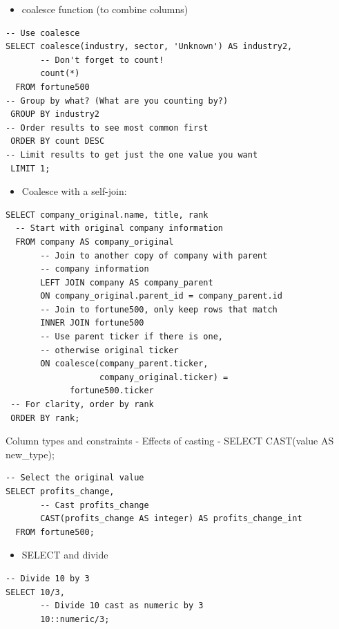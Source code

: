 \documentclass[]{book}
\providecommand{\tightlist}{%
  \setlength{\itemsep}{0pt}\setlength{\parskip}{0pt}}
\begin{document}
\begin{itemize}
\tightlist
\item
  coalesce function (to combine columns)
\end{itemize}

\begin{verbatim}
-- Use coalesce
SELECT coalesce(industry, sector, 'Unknown') AS industry2,
       -- Don't forget to count!
       count(*) 
  FROM fortune500 
-- Group by what? (What are you counting by?)
 GROUP BY industry2
-- Order results to see most common first
 ORDER BY count DESC
-- Limit results to get just the one value you want
 LIMIT 1;
\end{verbatim}

\begin{itemize}
\tightlist
\item
  Coalesce with a self-join:
\end{itemize}

\begin{verbatim}
SELECT company_original.name, title, rank
  -- Start with original company information
  FROM company AS company_original
       -- Join to another copy of company with parent
       -- company information
	   LEFT JOIN company AS company_parent
       ON company_original.parent_id = company_parent.id 
       -- Join to fortune500, only keep rows that match
       INNER JOIN fortune500 
       -- Use parent ticker if there is one, 
       -- otherwise original ticker
       ON coalesce(company_parent.ticker, 
                   company_original.ticker) = 
             fortune500.ticker
 -- For clarity, order by rank
 ORDER BY rank; 
\end{verbatim}

Column types and constraints
- Effects of casting
- SELECT CAST(value AS new\_type);

\begin{verbatim}
-- Select the original value
SELECT profits_change, 
	   -- Cast profits_change
       CAST(profits_change AS integer) AS profits_change_int
  FROM fortune500;
\end{verbatim}

\begin{itemize}
\tightlist
\item
  SELECT and divide
\end{itemize}

\begin{verbatim}
-- Divide 10 by 3
SELECT 10/3,
       -- Divide 10 cast as numeric by 3
       10::numeric/3;
\end{verbatim}
\end{document}
